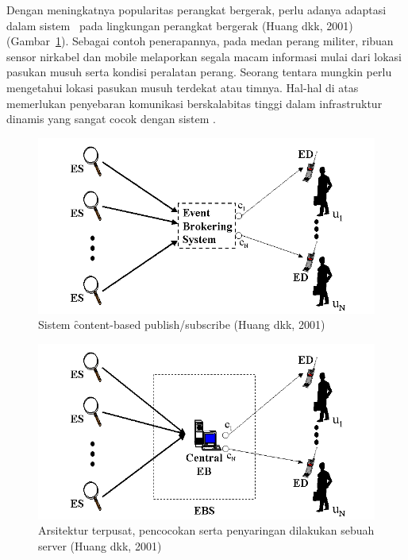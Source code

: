 Dengan meningkatnya popularitas perangkat bergerak, perlu adanya adaptasi dalam
sistem \pubsub~pada lingkungan perangkat bergerak (Huang dkk, 2001)
(Gambar~\ref{fig:content-based}). Sebagai contoh penerapannya, pada medan
perang militer, ribuan sensor nirkabel dan mobile melaporkan segala macam
informasi mulai dari lokasi pasukan musuh serta kondisi peralatan perang.
Seorang tentara mungkin perlu mengetahui lokasi pasukan musuh terdekat atau
timnya.  Hal-hal di atas memerlukan penyebaran komunikasi berskalabitas tinggi
dalam infrastruktur dinamis yang sangat cocok dengan sistem \pubsub.

\begin{figure}
    \centering
    \includegraphics[scale=0.40]
        {images/2-event-brokering-system.png}
    \caption{Sistem \f{content-based publish/subscribe (Huang dkk, 2001)}}
    \label{fig:content-based}
\end{figure}

\begin{figure}
    \centering
    \includegraphics[scale=0.40]
        {images/2-centralized-architecture.png}
    \caption{Arsitektur terpusat, pencocokan serta penyaringan dilakukan sebuah
      server (Huang dkk, 2001)}
    \label{fig:central}
\end{figure}

